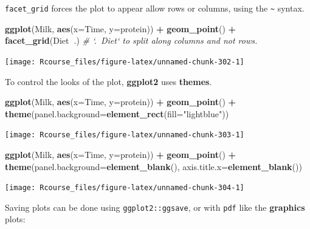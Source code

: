 \documentclass[]{book}
\newenvironment{Shaded}{\begin{snugshade}}{\end{snugshade}}
\newcommand{\KeywordTok}[1]{\textcolor[rgb]{0.13,0.29,0.53}{\textbf{#1}}}
\newcommand{\DataTypeTok}[1]{\textcolor[rgb]{0.13,0.29,0.53}{#1}}
\newcommand{\StringTok}[1]{\textcolor[rgb]{0.31,0.60,0.02}{#1}}
\newcommand{\CommentTok}[1]{\textcolor[rgb]{0.56,0.35,0.01}{\textit{#1}}}
\newcommand{\OperatorTok}[1]{\textcolor[rgb]{0.81,0.36,0.00}{\textbf{#1}}}
\newcommand{\NormalTok}[1]{#1}
\theoremstyle{definition}
\theoremstyle{definition}
\theoremstyle{definition}
\theoremstyle{remark}
\begin{document}
\texttt{facet\_grid} forces the plot to appear allow rows or columns,
using the \texttt{\textasciitilde{}} syntax.

\begin{Shaded}
\begin{Highlighting}[]
\KeywordTok{ggplot}\NormalTok{(Milk, }\KeywordTok{aes}\NormalTok{(}\DataTypeTok{x=}\NormalTok{Time, }\DataTypeTok{y=}\NormalTok{protein)) }\OperatorTok{+}
\StringTok{  }\KeywordTok{geom_point}\NormalTok{() }\OperatorTok{+}
\StringTok{  }\KeywordTok{facet_grid}\NormalTok{(Diet}\OperatorTok{~}\NormalTok{.) }\CommentTok{# `.~Diet` to split along columns and not rows.}
\end{Highlighting}
\end{Shaded}

\texttt{[image: Rcourse\_files/figure-latex/unnamed-chunk-302-1]}

To control the looks of the plot, \textbf{ggplot2} uses \textbf{themes}.

\begin{Shaded}
\begin{Highlighting}[]
\KeywordTok{ggplot}\NormalTok{(Milk, }\KeywordTok{aes}\NormalTok{(}\DataTypeTok{x=}\NormalTok{Time, }\DataTypeTok{y=}\NormalTok{protein)) }\OperatorTok{+}
\StringTok{  }\KeywordTok{geom_point}\NormalTok{() }\OperatorTok{+}
\StringTok{  }\KeywordTok{theme}\NormalTok{(}\DataTypeTok{panel.background=}\KeywordTok{element_rect}\NormalTok{(}\DataTypeTok{fill=}\StringTok{"lightblue"}\NormalTok{))}
\end{Highlighting}
\end{Shaded}

\texttt{[image: Rcourse\_files/figure-latex/unnamed-chunk-303-1]}

\begin{Shaded}
\begin{Highlighting}[]
\KeywordTok{ggplot}\NormalTok{(Milk, }\KeywordTok{aes}\NormalTok{(}\DataTypeTok{x=}\NormalTok{Time, }\DataTypeTok{y=}\NormalTok{protein)) }\OperatorTok{+}
\StringTok{  }\KeywordTok{geom_point}\NormalTok{() }\OperatorTok{+}
\StringTok{  }\KeywordTok{theme}\NormalTok{(}\DataTypeTok{panel.background=}\KeywordTok{element_blank}\NormalTok{(),}
        \DataTypeTok{axis.title.x=}\KeywordTok{element_blank}\NormalTok{())}
\end{Highlighting}
\end{Shaded}

\texttt{[image: Rcourse\_files/figure-latex/unnamed-chunk-304-1]}

Saving plots can be done using \texttt{ggplot2::ggsave}, or with
\texttt{pdf} like the \textbf{graphics} plots:
\end{document}
